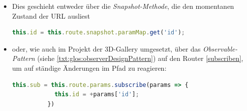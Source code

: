 \begin{itemize}
    \item Dies geschieht entweder über die \emph{Snapshot-Methode}, die den momentanen Zustand der URL ausliest 
    \begin{lstlisting}[caption={Snapshot der URL abfragen},language=TypeScript,label=lst:impl:routingsnapshot]
        this.id = this.route.snapshot.paramMap.get('id');
    \end{lstlisting}
    \item oder, wie auch im Projekt der 3D-Gallery umgesetzt, über das \emph{Observable-Pattern} (siehe \ref{txt:glos:observerDesignPattern}) auf den Router \ref{subscriben}, um auf ständige Änderungen im Pfad zu reagieren:
    \begin{lstlisting}[caption={Die URL subscriben},language=TypeScript,label=lst:impl:urlsubscription]
        this.sub = this.route.params.subscribe(params => {
            this.id = +params['id'];
          })
    \end{lstlisting}
\end{itemize}
\cite{AngularBuch}